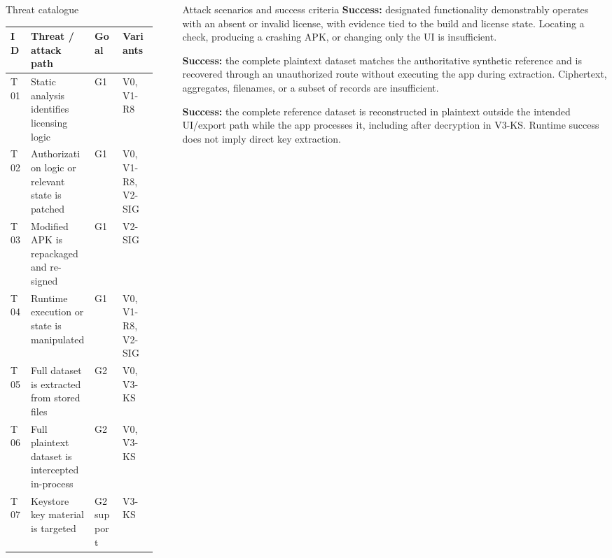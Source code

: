 \documentclass[final]{beamer}
\newlength{\sepwidth}
\newlength{\colwidth}
\newcommand{\separatorcolumn}{\begin{column}{\sepwidth}\end{column}}
\begin{document}
\begin{frame}[t]
\begin{columns}[t]
\begin{column}{\colwidth}
\begin{block}{Threat catalogue}
  \small
  \begin{tabularx}{\linewidth}{@{}L{2cm}Y L{3cm}L{7cm}@{}}
    \toprule
    \textbf{ID} & \textbf{Threat / attack path} & \textbf{Goal} & \textbf{Variants} \\
    \midrule
    T01 & Static analysis identifies licensing logic & G1 & V0, V1-R8 \\
    T02 & Authorization logic or relevant state is patched & G1 & V0, V1-R8, V2-SIG \\
    T03 & Modified APK is repackaged and re-signed & G1 & V2-SIG \\
    T04 & Runtime execution or state is manipulated & G1 & V0, V1-R8, V2-SIG \\
    T05 & Full dataset is extracted from stored files & G2 & V0, V3-KS \\
    T06 & Full plaintext dataset is intercepted in-process & G2 & V0, V3-KS \\
    T07 & Keystore key material is targeted & G2 support & V3-KS \\
    \bottomrule
  \end{tabularx}
\end{block}

\end{column}

\separatorcolumn

\begin{column}{\colwidth}

\begin{block}{Attack scenarios and success criteria}
  \textbf{Success:} designated functionality demonstrably operates with an
  absent or invalid license, with evidence tied to the build and license state.
  Locating a check, producing a crashing APK, or changing only the UI is insufficient.

  \textbf{Success:} the complete plaintext dataset matches the authoritative
  synthetic reference and is recovered through an unauthorized route without
  executing the app during extraction. Ciphertext, aggregates, filenames, or a
  subset of records are insufficient.

  \textbf{Success:} the complete reference dataset is reconstructed in plaintext
  outside the intended UI/export path while the app processes it, including
  after decryption in V3-KS. Runtime success does not imply direct key extraction.
\end{block}


\end{column}
\end{columns}
\end{frame}
\end{document}
